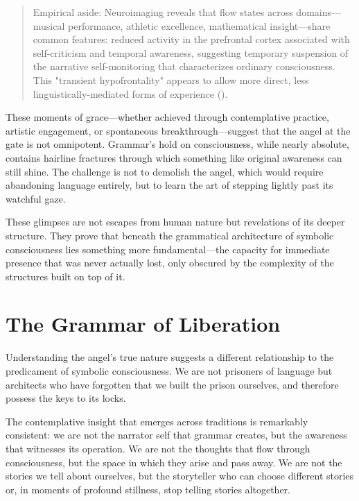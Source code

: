 \begin{quote}\small
Empirical aside: Neuroimaging reveals that flow states across domains—musical performance, athletic excellence, mathematical insight—share common features: reduced activity in the prefrontal cortex associated with self-criticism and temporal awareness, suggesting temporary suspension of the narrative self-monitoring that characterizes ordinary consciousness. This "transient hypofrontality" appears to allow more direct, less linguistically-mediated forms of experience (\parencite{dietrich2004neurocognitive,limb2008neural}).
\end{quote}

These moments of grace—whether achieved through contemplative practice, artistic engagement, or spontaneous breakthrough—suggest that the angel at the gate is not omnipotent. Grammar's hold on consciousness, while nearly absolute, contains hairline fractures through which something like original awareness can still shine. The challenge is not to demolish the angel, which would require abandoning language entirely, but to learn the art of stepping lightly past its watchful gaze.

These glimpses are not escapes from human nature but revelations of its deeper structure. They prove that beneath the grammatical architecture of symbolic consciousness lies something more fundamental—the capacity for immediate presence that was never actually lost, only obscured by the complexity of the structures built on top of it.

\section{The Grammar of Liberation}

Understanding the angel's true nature suggests a different relationship to the predicament of symbolic consciousness. We are not prisoners of language but architects who have forgotten that we built the prison ourselves, and therefore possess the keys to its locks.

The contemplative insight that emerges across traditions is remarkably consistent: we are not the narrator self that grammar creates, but the awareness that witnesses its operation. We are not the thoughts that flow through consciousness, but the space in which they arise and pass away. We are not the stories we tell about ourselves, but the storyteller who can choose different stories or, in moments of profound stillness, stop telling stories altogether.

